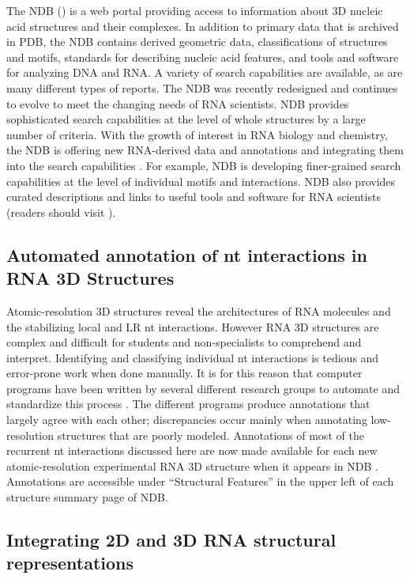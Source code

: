 The NDB () is a web portal providing access to
information about 3D nucleic acid structures and their complexes. In addition to
primary data that is archived in PDB, the NDB contains derived geometric data,
classifications of structures and motifs, standards for describing nucleic acid
features, and tools and software for analyzing DNA and RNA. A variety of search
capabilities are available, as are many different types of reports. The NDB was
recently redesigned and continues to evolve to meet the changing needs of RNA
scientists. NDB provides sophisticated search capabilities at the level of whole
structures by a large number of criteria. With the growth of interest in RNA
biology and chemistry, the NDB is offering new RNA-derived data and annotations
and integrating them into the search capabilities
\cite{CoimbatoreNarayanan2014}. For example, NDB is developing finer-grained
search capabilities at the level of individual motifs and interactions. NDB also
provides curated descriptions and links to useful tools and software for RNA
scientists (readers should visit
).

\subsection{Automated annotation of nt interactions in RNA 3D Structures}

Atomic-resolution 3D structures reveal the architectures of RNA molecules and
the stabilizing local and LR nt interactions. However RNA 3D structures are
complex and difficult for students and non-specialists to comprehend and
interpret. Identifying and classifying individual nt interactions is tedious and
error-prone work when done manually. It is for this reason that computer
programs have been written by several different research groups to automate and
standardize this process \cite{Petrov2011a, Sarver2008a, Yang2003a,
Gendron2001b, Parisien2008a}. The different programs produce annotations that
largely agree with each other; discrepancies occur mainly when annotating
low-resolution structures that are poorly modeled. Annotations of most of the
recurrent nt interactions discussed here are now made available for each new
atomic-resolution experimental RNA 3D structure when it appears in NDB
\cite{Petrov2013}. Annotations are accessible under ``Structural Features'' in
the upper left of each structure summary page of NDB. 

\subsection{Integrating 2D and 3D RNA structural representations}

